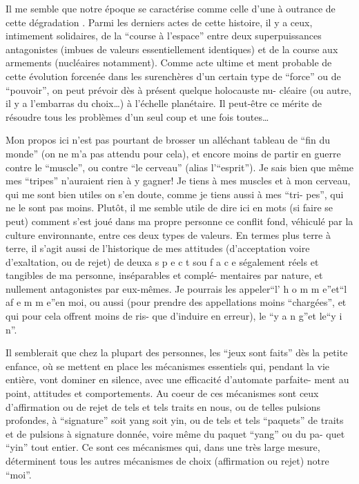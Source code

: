 Il me semble que notre époque se caractérise comme celle d'une 
à outrance de cette dégradation . Parmi les derniers actes de cette
histoire, il y a ceux, intimement solidaires, de la ``course à l'espace'' entre 
deux superpuissances antagonistes (imbues de valeurs essentiellement identiques)
et de la course aux armements (nucléaires notamment). Comme acte ultime et \newline
ment probable de cette évolution forcenée dans les surenchères d'un certain type
de ``force'' ou de ``pouvoir'', on peut prévoir dès à présent quelque holocauste nu-\newline
cléaire (ou autre, il y a l'embarras du choix\ldots) à l'échelle planétaire. Il 
peut-être ce mérite de résoudre tous les problèmes d'un seul coup et une fois 
toutes\ldots

Mon propos ici n'est pas pourtant de brosser un alléchant tableau de ``fin
du monde'' (on ne m'a pas attendu pour cela), et encore moins de partir en guerre
contre le ``muscle'', ou contre ``le cerveau'' (alias l'``esprit''). Je sais bien que
même mes ``tripes'' n'auraient rien à y gagner! Je tiens à mes muscles et à mon
cerveau, qui me sont bien utiles on s'en doute, comme je tiens aussi à mes ``tri-\newline
pes'', qui ne le sont pas moins. Plutôt, il me semble utile de dire ici en 
mots (si faire se peut) comment s'est joué dans ma propre personne ce conflit \newline
fond, véhiculé par la culture environnante, entre ces deux types de valeurs. En
termes plus terre à terre, il s'agit aussi de l'historique de mes attitudes
(d'acceptation voire d'exaltation, ou de rejet) de deux\quad a s p e c t s\quad ou
f a c e s\quad également réels et tangibles de ma personne, inséparables et complé-\newline
mentaires par nature, et nullement antagonistes par eux-mêmes. Je pourrais les
appeler\quad ``l' h o m m e''\quad et\quad ``l a\quad f e m m e''\quad en moi, ou aussi (pour
prendre des appellations moins ``chargées'', et qui pour cela offrent moins de ris-\newline
que d'induire en erreur), le ``y a n g''\quad et le\quad ``y i n''.

Il semblerait que chez la plupart des personnes, les ``jeux sont faits'' dès
la petite enfance, où se mettent en place les mécanismes essentiels qui, pendant
la vie entière, vont dominer en silence, avec une efficacité d'automate parfaite-\newline
ment au point, attitudes et comportements. Au coeur de ces mécanismes sont ceux
d'affirmation ou de rejet de tels et tels traits en nous, ou de telles pulsions
profondes, à ``signature'' soit yang soit yin, ou de tels et tels ``paquets'' de
traits et de pulsions à signature donnée, voire même du paquet ``yang'' ou du pa-\newline
quet ``yin'' tout entier. Ce sont ces mécanismes qui, dans une très large mesure,
déterminent tous les autres mécanismes de choix (affirmation ou rejet) 
notre ``moi''.
